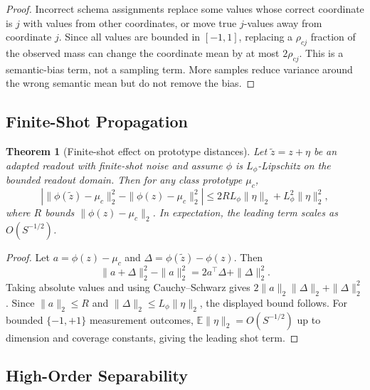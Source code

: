 \documentclass[preprint]{elsarticle}
\newcommand{\E}{\mathbb{E}}
\newtheorem{theorem}{Theorem}
\begin{document}
\begin{proof}
Incorrect schema assignments replace some values whose correct coordinate is \(j\) with values from other coordinates, or move true \(j\)-values away from coordinate \(j\). Since all values are bounded in \([-1,1]\), replacing a \(\rho_{cj}\) fraction of the observed mass can change the coordinate mean by at most \(2\rho_{cj}\). This is a semantic-bias term, not a sampling term. More samples reduce variance around the wrong semantic mean but do not remove the bias.
\end{proof}

\subsection{Finite-Shot Propagation}

\begin{theorem}[Finite-shot effect on prototype distances]
Let \(\tilde{z}=z+\eta\) be an adapted readout with finite-shot noise and assume \(\phi\) is \(L_\phi\)-Lipschitz on the bounded readout domain. Then for any class prototype \(\mu_c\),
\begin{equation}
    \left|
    \|\phi(\tilde{z})-\mu_c\|_2^2
    -
    \|\phi(z)-\mu_c\|_2^2
    \right|
    \le
    2R L_\phi\|\eta\|_2 + L_\phi^2\|\eta\|_2^2,
\end{equation}
where \(R\) bounds \(\|\phi(z)-\mu_c\|_2\). In expectation, the leading term scales as \(O(S^{-1/2})\).
\end{theorem}

\begin{proof}
Let \(a=\phi(z)-\mu_c\) and \(\Delta=\phi(\tilde z)-\phi(z)\). Then
\begin{equation}
    \|a+\Delta\|_2^2-\|a\|_2^2=2a^\top\Delta+\|\Delta\|_2^2.
\end{equation}
Taking absolute values and using Cauchy--Schwarz gives \(2\|a\|_2\|\Delta\|_2+\|\Delta\|_2^2\). Since \(\|a\|_2\le R\) and \(\|\Delta\|_2\le L_\phi\|\eta\|_2\), the displayed bound follows. For bounded \(\{-1,+1\}\) measurement outcomes, \(\E\|\eta\|_2=O(S^{-1/2})\) up to dimension and coverage constants, giving the leading shot term.
\end{proof}

\subsection{High-Order Separability}
\end{document}
